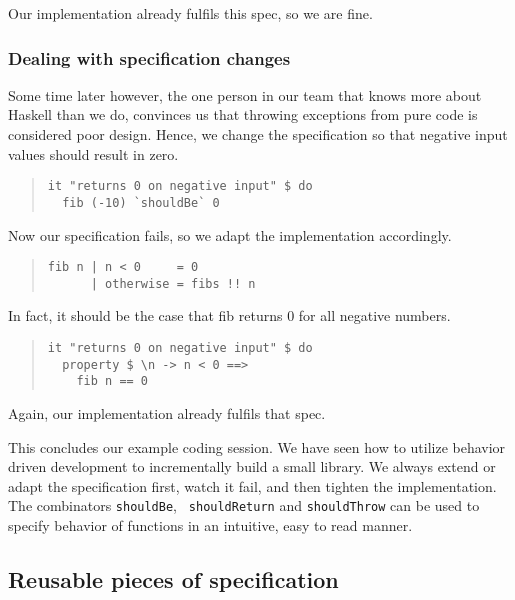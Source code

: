 \documentclass[preprint]{sigplanconf}
\begin{document}
\noindent Our implementation already fulfils this spec, so we are
fine.

\subsubsection{Dealing with specification changes}

Some time later however, the one person in our team that knows
more about Haskell than we do, convinces us that throwing exceptions
from pure code is considered poor design. Hence, we change the
specification so that negative input values should result in zero.

\begin{quote}
\small
\begin{verbatim}
it "returns 0 on negative input" $ do
  fib (-10) `shouldBe` 0
\end{verbatim}
\end{quote}

\noindent Now our specification fails, so we adapt the implementation
accordingly.

\begin{quote}
\small
\begin{verbatim}
fib n | n < 0     = 0
      | otherwise = fibs !! n
\end{verbatim}
\end{quote}

\noindent In fact, it should be the case that fib returns 0 for all
negative numbers.

\begin{quote}
\small
\begin{verbatim}
it "returns 0 on negative input" $ do
  property $ \n -> n < 0 ==>
    fib n == 0
\end{verbatim}
\end{quote}


\noindent Again, our implementation already fulfils that spec.

This concludes our example coding session.  We have seen how to utilize
behavior driven development to incrementally build a small library.
We always extend or adapt the specification first, watch it fail,  and
then tighten the implementation.  The combinators {\tt shouldBe}, {\tt
shouldReturn} and {\tt shouldThrow} can be used to specify behavior of
functions in an intuitive, easy to read manner.

\subsection{Reusable pieces of specification}
\label{sec:reusable-specs}
\end{document}
